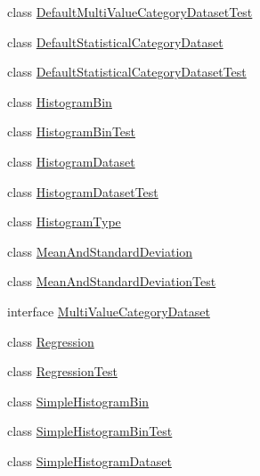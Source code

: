 \begin{DoxyCompactItemize}
\item 
class \mbox{\hyperlink{classorg_1_1jfree_1_1data_1_1statistics_1_1_default_multi_value_category_dataset_test}{Default\+Multi\+Value\+Category\+Dataset\+Test}}
\item 
class \mbox{\hyperlink{classorg_1_1jfree_1_1data_1_1statistics_1_1_default_statistical_category_dataset}{Default\+Statistical\+Category\+Dataset}}
\item 
class \mbox{\hyperlink{classorg_1_1jfree_1_1data_1_1statistics_1_1_default_statistical_category_dataset_test}{Default\+Statistical\+Category\+Dataset\+Test}}
\item 
class \mbox{\hyperlink{classorg_1_1jfree_1_1data_1_1statistics_1_1_histogram_bin}{Histogram\+Bin}}
\item 
class \mbox{\hyperlink{classorg_1_1jfree_1_1data_1_1statistics_1_1_histogram_bin_test}{Histogram\+Bin\+Test}}
\item 
class \mbox{\hyperlink{classorg_1_1jfree_1_1data_1_1statistics_1_1_histogram_dataset}{Histogram\+Dataset}}
\item 
class \mbox{\hyperlink{classorg_1_1jfree_1_1data_1_1statistics_1_1_histogram_dataset_test}{Histogram\+Dataset\+Test}}
\item 
class \mbox{\hyperlink{classorg_1_1jfree_1_1data_1_1statistics_1_1_histogram_type}{Histogram\+Type}}
\item 
class \mbox{\hyperlink{classorg_1_1jfree_1_1data_1_1statistics_1_1_mean_and_standard_deviation}{Mean\+And\+Standard\+Deviation}}
\item 
class \mbox{\hyperlink{classorg_1_1jfree_1_1data_1_1statistics_1_1_mean_and_standard_deviation_test}{Mean\+And\+Standard\+Deviation\+Test}}
\item 
interface \mbox{\hyperlink{interfaceorg_1_1jfree_1_1data_1_1statistics_1_1_multi_value_category_dataset}{Multi\+Value\+Category\+Dataset}}
\item 
class \mbox{\hyperlink{classorg_1_1jfree_1_1data_1_1statistics_1_1_regression}{Regression}}
\item 
class \mbox{\hyperlink{classorg_1_1jfree_1_1data_1_1statistics_1_1_regression_test}{Regression\+Test}}
\item 
class \mbox{\hyperlink{classorg_1_1jfree_1_1data_1_1statistics_1_1_simple_histogram_bin}{Simple\+Histogram\+Bin}}
\item 
class \mbox{\hyperlink{classorg_1_1jfree_1_1data_1_1statistics_1_1_simple_histogram_bin_test}{Simple\+Histogram\+Bin\+Test}}
\item 
class \mbox{\hyperlink{classorg_1_1jfree_1_1data_1_1statistics_1_1_simple_histogram_dataset}{Simple\+Histogram\+Dataset}}

\end{DoxyCompactItemize}
